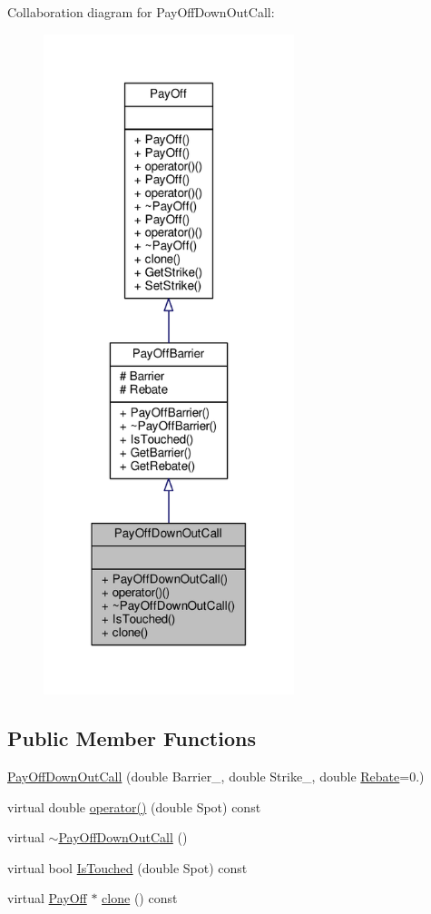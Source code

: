 Collaboration diagram for Pay\+Off\+Down\+Out\+Call\+:
\nopagebreak
\begin{figure}[H]
\begin{center}
\leavevmode
\includegraphics[width=207pt]{classPayOffDownOutCall__coll__graph}
\end{center}
\end{figure}
\subsection*{Public Member Functions}
\begin{DoxyCompactItemize}
\item 
\hyperlink{classPayOffDownOutCall_a2fd200f24f2c56766f5193f3c10a0d61}{Pay\+Off\+Down\+Out\+Call} (double Barrier\+\_\+, double Strike\+\_\+, double \hyperlink{classPayOffBarrier_aca3ea631dcdb28a1df971b74774e41f8}{Rebate}=0.)
\item 
virtual double \hyperlink{classPayOffDownOutCall_abbc1f3cb88555c9b01acac09b38832b1}{operator()} (double Spot) const
\item 
virtual \hyperlink{classPayOffDownOutCall_ab2fcb3cf46971007e31d46b6478a52c1}{$\sim$\+Pay\+Off\+Down\+Out\+Call} ()
\item 
virtual bool \hyperlink{classPayOffDownOutCall_a516af0320ef04d315b66a924e346aa78}{Is\+Touched} (double Spot) const
\item 
virtual \hyperlink{classPayOff}{Pay\+Off} $\ast$ \hyperlink{classPayOffDownOutCall_a3c52ed87e5ca563883a37f55ca99ecd1}{clone} () const
\end{DoxyCompactItemize}
